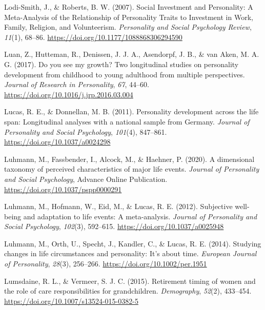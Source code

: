 \documentclass[
  english,
  man,floatsintext]{apa7}
\begin{document}
\leavevmode\hypertarget{ref-lodi-smithSocialInvestmentPersonality2007}{}%
Lodi-Smith, J., \& Roberts, B. W. (2007). Social Investment and Personality: A Meta-Analysis of the Relationship of Personality Traits to Investment in Work, Family, Religion, and Volunteerism. \emph{Personality and Social Psychology Review}, \emph{11}(1), 68--86. \url{https://doi.org/10.1177/1088868306294590}

\leavevmode\hypertarget{ref-luanYouSeeMy2017}{}%
Luan, Z., Hutteman, R., Denissen, J. J. A., Asendorpf, J. B., \& van Aken, M. A. G. (2017). Do you see my growth? Two longitudinal studies on personality development from childhood to young adulthood from multiple perspectives. \emph{Journal of Research in Personality}, \emph{67}, 44--60. \url{https://doi.org/10.1016/j.jrp.2016.03.004}

\leavevmode\hypertarget{ref-lucasPersonalityDevelopmentLife2011}{}%
Lucas, R. E., \& Donnellan, M. B. (2011). Personality development across the life span: Longitudinal analyses with a national sample from Germany. \emph{Journal of Personality and Social Psychology}, \emph{101}(4), 847--861. \url{https://doi.org/10.1037/a0024298}

\leavevmode\hypertarget{ref-luhmannDimensionalTaxonomyPerceived2020}{}%
Luhmann, M., Fassbender, I., Alcock, M., \& Haehner, P. (2020). A dimensional taxonomy of perceived characteristics of major life events. \emph{Journal of Personality and Social Psychology}, Advance Online Publication. \url{https://doi.org/10.1037/pspp0000291}

\leavevmode\hypertarget{ref-luhmannSubjectiveWellbeingAdaptation2012}{}%
Luhmann, M., Hofmann, W., Eid, M., \& Lucas, R. E. (2012). Subjective well-being and adaptation to life events: A meta-analysis. \emph{Journal of Personality and Social Psychology}, \emph{102}(3), 592--615. \url{https://doi.org/10.1037/a0025948}

\leavevmode\hypertarget{ref-luhmannStudyingChangesLife2014}{}%
Luhmann, M., Orth, U., Specht, J., Kandler, C., \& Lucas, R. E. (2014). Studying changes in life circumstances and personality: It's about time. \emph{European Journal of Personality}, \emph{28}(3), 256--266. \url{https://doi.org/10.1002/per.1951}

\leavevmode\hypertarget{ref-lumsdaineRetirementTimingWomen2015}{}%
Lumsdaine, R. L., \& Vermeer, S. J. C. (2015). Retirement timing of women and the role of care responsibilities for grandchildren. \emph{Demography}, \emph{52}(2), 433--454. \url{https://doi.org/10.1007/s13524-015-0382-5}
\end{document}
